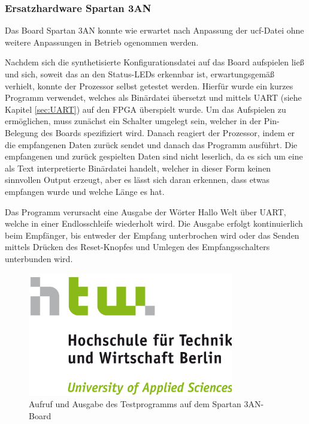 \documentclass[11pt,a4paper,titlepage]{article}
\begin{document}
\subsubsection{Ersatzhardware Spartan 3AN}

Das Board Spartan 3AN konnte wie erwartet nach Anpassung der ucf-Datei ohne weitere Anpassungen in Betrieb ogenommen werden.

Nachdem sich die synthetisierte Konfigurationsdatei auf das Board aufspielen ließ und sich, soweit das an den Status-LEDs erkennbar ist, erwartungsgemäß verhielt, konnte der Prozessor selbst getestet werden. Hierfür wurde ein kurzes Programm verwendet, welches als Binärdatei übersetzt und mittels UART (siehe Kapitel \ref{sec:UART}) auf den FPGA überspielt wurde. Um das Aufspielen zu ermöglichen, muss zunächst ein Schalter umgelegt sein, welcher in der Pin-Belegung des Boards spezifiziert wird. Danach reagiert der Prozessor, indem er die empfangenen Daten zurück sendet und danach das Programm ausführt. Die empfangenen und zurück gespielten Daten sind nicht leserlich, da es sich um eine als Text interpretierte Binärdatei handelt, welcher in dieser Form keinen sinnvollen Output erzeugt, aber es lässt sich daran erkennen, dass etwas empfangen wurde und welche Länge es hat.

Das Programm verursacht eine Ausgabe der Wörter Hallo Welt über UART, welche in einer Endlosschleife wiederholt wird. Die Ausgabe erfolgt kontinuierlich beim Empfänger, bis entweder der Empfang unterbrochen wird oder das Senden mittels Drücken des Reset-Knopfes und Umlegen des Empfangsschalters unterbunden wird.

\begin{figure}
\centering
\includegraphics[width=0.8\textwidth]{images/htw_hochschule.png}
\caption{Aufruf und Ausgabe des Testprogramms auf dem Spartan 3AN-Board}
\label{img:HalloSpartan}
\end{figure}
\end{document}
